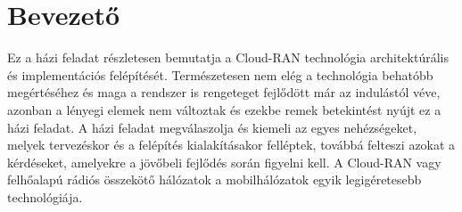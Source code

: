 \chapter*{Bevezető}
\hspace{2mm}
Ez a házi feladat részletesen bemutatja a Cloud-RAN technológia architektúrális és implementációs felépítését. Természetesen nem elég a technológia behatóbb megértéséhez és maga a rendszer is rengeteget fejlődött már az indulástól véve, azonban a lényegi elemek nem változtak és ezekbe remek betekintést nyújt ez a házi feladat.
A házi feladat megválaszolja és kiemeli az egyes nehézségeket, melyek tervezéskor és a felépítés kialakításakor felléptek, továbbá felteszi azokat a kérdéseket, amelyekre a jövőbeli fejlődés során figyelni kell.
A Cloud-RAN vagy felhőalapú rádiós összekötő hálózatok a mobilhálózatok egyik legigéretesebb technológiája.
